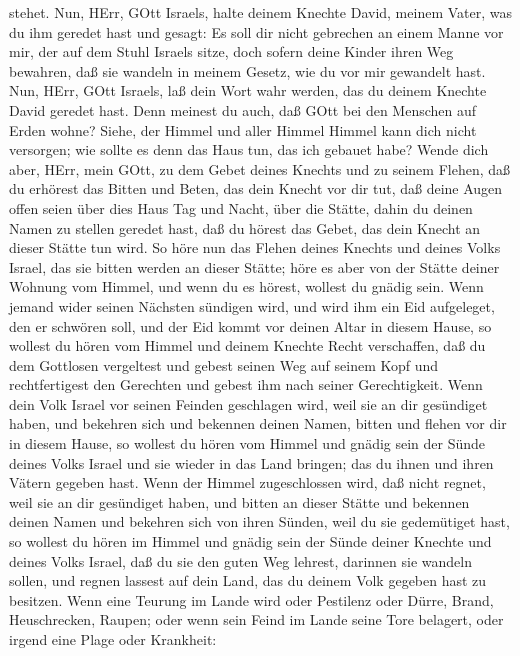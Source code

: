 stehet.  Nun, HErr, GOtt Israels, halte deinem Knechte
David, meinem Vater, was du ihm geredet hast und gesagt: Es soll dir
nicht gebrechen an einem Manne vor mir, der auf dem Stuhl Israels sitze,
doch sofern deine Kinder ihren Weg bewahren, daß sie wandeln in meinem
Gesetz, wie du vor mir gewandelt hast.  Nun, HErr, GOtt
Israels, laß dein Wort wahr werden, das du deinem Knechte David geredet
hast.  Denn meinest du auch, daß GOtt bei den Menschen auf
Erden wohne? Siehe, der Himmel und aller Himmel Himmel kann dich nicht
versorgen; wie sollte es denn das Haus tun, das ich gebauet habe?
 Wende dich aber, HErr, mein GOtt, zu dem Gebet deines
Knechts und zu seinem Flehen, daß du erhörest das Bitten und Beten, das
dein Knecht vor dir tut,  daß deine Augen offen seien über
dies Haus Tag und Nacht, über die Stätte, dahin du deinen Namen zu
stellen geredet hast, daß du hörest das Gebet, das dein Knecht an dieser
Stätte tun wird.  So höre nun das Flehen deines Knechts und
deines Volks Israel, das sie bitten werden an dieser Stätte; höre es
aber von der Stätte deiner Wohnung vom Himmel, und wenn du es hörest,
wollest du gnädig sein.  Wenn jemand wider seinen Nächsten
sündigen wird, und wird ihm ein Eid aufgeleget, den er schwören soll,
und der Eid kommt vor deinen Altar in diesem Hause,  so
wollest du hören vom Himmel und deinem Knechte Recht verschaffen, daß du
dem Gottlosen vergeltest und gebest seinen Weg auf seinem Kopf und
rechtfertigest den Gerechten und gebest ihm nach seiner Gerechtigkeit.
 Wenn dein Volk Israel vor seinen Feinden geschlagen wird,
weil sie an dir gesündiget haben, und bekehren sich und bekennen deinen
Namen, bitten und flehen vor dir in diesem Hause,  so
wollest du hören vom Himmel und gnädig sein der Sünde deines Volks
Israel und sie wieder in das Land bringen; das du ihnen und ihren Vätern
gegeben hast.  Wenn der Himmel zugeschlossen wird, daß
nicht regnet, weil sie an dir gesündiget haben, und bitten an dieser
Stätte und bekennen deinen Namen und bekehren sich von ihren Sünden,
weil du sie gedemütiget hast,  so wollest du hören im
Himmel und gnädig sein der Sünde deiner Knechte und deines Volks Israel,
daß du sie den guten Weg lehrest, darinnen sie wandeln sollen, und
regnen lassest auf dein Land, das du deinem Volk gegeben hast zu
besitzen.  Wenn eine Teurung im Lande wird oder Pestilenz
oder Dürre, Brand, Heuschrecken, Raupen; oder wenn sein Feind im Lande
seine Tore belagert, oder irgend eine Plage oder Krankheit:
